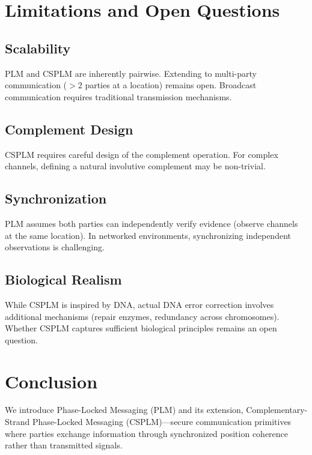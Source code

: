 \documentclass[twocolumn,10pt,a4paper]{article}
\theoremstyle{plain}
\theoremstyle{definition}
\begin{document}
\section{Limitations and Open Questions}

\subsection{Scalability}

PLM and CSPLM are inherently pairwise. Extending to multi-party communication ($>2$ parties at a location) remains open. Broadcast communication requires traditional transmission mechanisms.

\subsection{Complement Design}

CSPLM requires careful design of the complement operation. For complex channels, defining a natural involutive complement may be non-trivial.

\subsection{Synchronization}

PLM assumes both parties can independently verify evidence (observe channels at the same location). In networked environments, synchronizing independent observations is challenging.

\subsection{Biological Realism}

While CSPLM is inspired by DNA, actual DNA error correction involves additional mechanisms (repair enzymes, redundancy across chromosomes). Whether CSPLM captures sufficient biological principles remains an open question.

\section{Conclusion}
\label{sec:conclusion}

We introduce Phase-Locked Messaging (PLM) and its extension, Complementary-Strand Phase-Locked Messaging (CSPLM)---secure communication primitives where parties exchange information through synchronized position coherence rather than transmitted signals.
\end{document}
